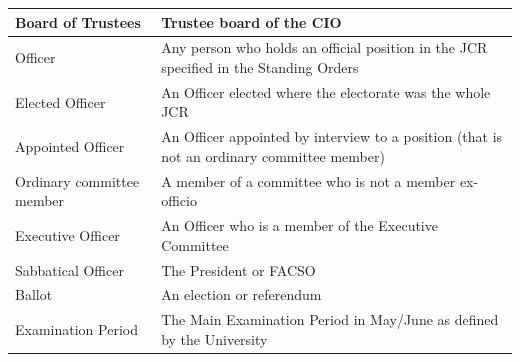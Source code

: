 \documentclass[12pt]{article}
\begin{document}
\begin{enumerate}
\begin{tabular}{|p{1.5in}|p{3.8in}|}
    Board of Trustees		& Trustee board of the CIO\\\hline
    Officer                 & Any person who holds an official position in the JCR specified in the Standing Orders\\ \hline
    Elected Officer         & An Officer elected where the electorate was the whole JCR \\ \hline
    Appointed Officer       & An Officer appointed by interview to a position (that is not an ordinary committee member) \\ \hline
    Ordinary committee member & A member of a committee who is not a member ex-officio \\ \hline
    Executive Officer       & An Officer who is a member of the Executive Committee \\ \hline
    Sabbatical Officer		& The President or FACSO\\\hline
    Ballot                  & An election or referendum \\ \hline
    Examination Period      & The Main Examination Period in May/June as defined by the University\\\hline
\end{tabular}
\end{enumerate}
\end{document}
